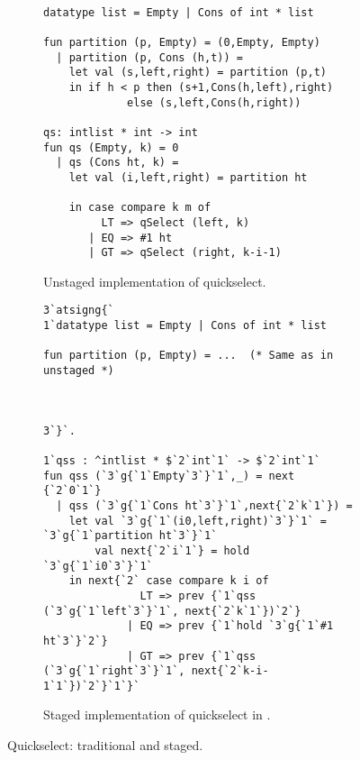 
\begin{figure*}
\begin{subfigure}[t]{0.45\textwidth}
\begin{lstlisting} 

datatype list = Empty | Cons of int * list

fun partition (p, Empty) = (0,Empty, Empty) 
  | partition (p, Cons (h,t)) = 
    let val (s,left,right) = partition (p,t) 
    in if h < p then (s+1,Cons(h,left),right) 
             else (s,left,Cons(h,right))

qs: intlist * int -> int
fun qs (Empty, k) = 0
  | qs (Cons ht, k) =
    let val (i,left,right) = partition ht

    in case compare k m of
         LT => qSelect (left, k)
       | EQ => #1 ht
       | GT => qSelect (right, k-i-1)
\end{lstlisting}
\caption{Unstaged implementation of quickselect.}
\label{fig:qs-unstaged}
\end{subfigure}
\hfill
\begin{subfigure}[t]{0.55\textwidth}
\begin{lstlisting} 
3`atsigng{`  
1`datatype list = Empty | Cons of int * list

fun partition (p, Empty) = ...  (* Same as in unstaged *)



3`}`.

1`qss : ^intlist * $`2`int`1` -> $`2`int`1`
fun qss (`3`g{`1`Empty`3`}`1`,_) = next {`2`0`1`}
  | qss (`3`g{`1`Cons ht`3`}`1`,next{`2`k`1`}) = 
    let val `3`g{`1`(i0,left,right)`3`}`1` = `3`g{`1`partition ht`3`}`1`
        val next{`2`i`1`} = hold `3`g{`1`i0`3`}`1`
    in next{`2` case compare k i of
               LT => prev {`1`qss (`3`g{`1`left`3`}`1`, next{`2`k`1`})`2`}
             | EQ => prev {`1`hold `3`g{`1`#1 ht`3`}`2`}
             | GT => prev {`1`qss (`3`g{`1`right`3`}`1`, next{`2`k-i-1`1`})`2`}`1`}`
\end{lstlisting}
\caption{Staged implementation of quickselect in \lang.}

\label{fig:qs-staged}
\end{subfigure}
\caption{Quickselect: traditional and staged.}
\end{figure*}

